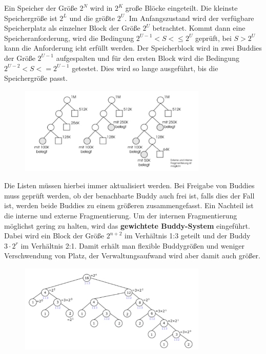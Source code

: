 \documentclass{article}
\begin{document}
    Ein Speicher der Größe $2^N$ wird in $2^K$ große Blöcke eingeteilt. Die kleinste Speichergröße ist $2^L$ und die größte $2^U$. Im Anfangszustand wird der verfügbare Speicherplatz als einzelner Block der Größe $2^U$ betrachtet. Kommt dann eine Speicheranforderung, wird die Bedingung $2^{U-1}<S<\leq 2^U$ geprüft, bei $S>2^U$ kann die Anforderung icht erfüllt werden. Der Speicherblock wird in zwei Buddies der Größe $2^{U-1}$ aufgespalten und für den ersten Block wird die Bedingung $2^{U-2}<S<=2^{U-1}$ getestet. Dies wird so lange ausgeführt, bis die Speichergröße passt.
    \begin{figure}[H]
        \centering
	    \includegraphics[width=90mm]{Skizzen/3_Kapitel/buddysystem.png}
    \end{figure}\newline
    Die Listen müssen hierbei immer aktualisiert werden. Bei Freigabe von Buddies muss geprüft werden, ob der benachbarte Buddy auch frei ist, falls dies der Fall ist, werden beide Buddies zu einem größeren zusammengefasst. Ein Nachteil ist die interne und externe Fragmentierung.\newline
    Um der internen Fragmentierung möglichst gering zu halten, wird das \textbf{gewichtete Buddy-System} eingeführt. Dabei wird ein Block der Größe $2^{n+2}$ im Verhältnis 1:3 geteilt und der Buddy $3\cdot 2^r$ im Verhältnis 2:1. Damit erhält man flexible Buddygrößen und weniger Verschwendung von Platz, der Verwaltungsaufwand wird aber damit auch größer.
    \begin{figure}[H]
        \centering
	    \includegraphics[width=90mm]{Skizzen/3_Kapitel/gewichtetesbuddysystem.png}
    \end{figure}
\end{document}
